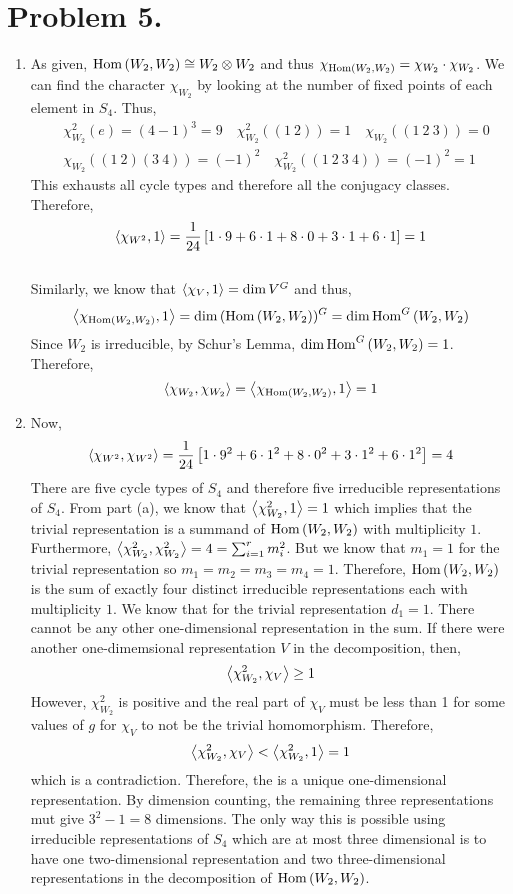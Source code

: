 \documentclass[12pt]{extarticle}
\begin{document}
\section*{Problem 5.}
\begin{enumerate}
\item As given, $\mathrm{Hom}\left( W_2, W_2 \right) \cong W_2 \otimes W_2$ and thus $\chi_{\mathrm{Hom}\left( W_2, W_2 \right)} = \chi_{W_2} \cdot \chi_{W_2}$. We can find the character $\chi_{W_2}$ by looking at the number of fixed points of each element in $S_4$. Thus, 
\begin{align*}
& \chi_{W_2}^2(e) = (4 - 1)^3 = 9 \quad \chi_{W_2}^2((1 \: 2)) = 1 \quad \chi_{W_2}((1 \: 2 \: 3)) = 0
\\
& \chi_{W_2}((1 \: 2)(3 \: 4))  = (-1)^2 \quad \chi_{W_2}^2((1 \: 2 \: 3 \: 4)) = (-1)^2 = 1
\end{align*}
This exhausts all cycle types and therefore all the conjugacy classes. Therefore,
\begin{align*}
\left< \chi_{W^2}, 1 \right> = \frac{1}{24} \left[ 1 \cdot 9 + 6 \cdot 1 + 8 \cdot 0 + 3 \cdot 1 + 6 \cdot 1 \right] = 1
\end{align*} \bigskip\\
Similarly, we know that $\left< \chi_V, 1 \right> = \dim{V^G}$ and thus,
\[\left< \chi_{\mathrm{Hom}\left( W_2, W_2 \right)}, 1 \right> = \dim{(\mathrm{Hom}\left( W_2, W_2 \right))^G} = \dim \mathrm{Hom}^{G} \left( W_2, W_2 \right)\] 
Since $W_2$ is irreducible, by Schur's Lemma, $\dim \mathrm{Hom}^{G} \left( W_2, W_2 \right) = 1$. Therefore,
 \[\left< \chi_{W_2}, \chi_{W_2} \right> = \left< \chi_{\mathrm{Hom}\left( W_2, W_2 \right)}, 1 \right> = 1\] 

\item Now,
\begin{align*}
\left< \chi_{W^2}, \chi_{W^2} \right> = \frac{1}{24} \left[ 1 \cdot 9^2 + 6 \cdot 1^2 + 8 \cdot 0^2 + 3 \cdot 1^2 + 6 \cdot 1^2 \right] = 4
\end{align*} 
There are five cycle types of $S_4$ and therefore five irreducible representations of $S_4$.  From part (a), we know that $\left< \chi_{W_2}^2, 1 \right> = 1$ which implies that the trivial representation is a summand of $\mathrm{Hom}\left( W_2, W_2 \right)$ with multiplicity $1$. Furthermore, $\left< \chi_{W_2}^2, \chi_{W_2}^2 \right> = 4 = \sum_{i = 1}^r m_i^2$. But we know that $m_1 = 1$ for the trivial representation so $m_1 = m_2 = m_3 = m_4 = 1$. Therefore, $\mathrm{Hom}\left( W_2, W_2 \right)$ is the sum of exactly four distinct irreducible representations each with multiplicity $1$. We know that for the trivial representation $d_1 = 1$. There cannot be any other one-dimensional representation in the sum. If there were another one-dimemsional representation $V$ in the decomposition, then,
\[ \left< \chi_{W_2}^2, \chi_V \right>  \ge 1 \]
However, $\chi_{W_2}^2$ is positive and the real part of $\chi_{V}$ must be less than 1 for some values of $g$ for $\chi_V$ to not be the trivial homomorphism. Therefore, 
\[\left< \chi_{W_2}^2, \chi_V \right> < \left< \chi_{W_2}^2, 1 \right> = 1\] which is a contradiction. Therefore, the is a unique one-dimensional representation. By dimension counting, the remaining three representations mut give $3^2 - 1 = 8$ dimensions. The only way this is possible using irreducible representations of $S_4$ which are at most three dimensional is to have one two-dimensional representation and two three-dimensional representations in the decomposition of $\mathrm{Hom}\left( W_2, W_2 \right)$. 



\end{enumerate}
\end{document}
